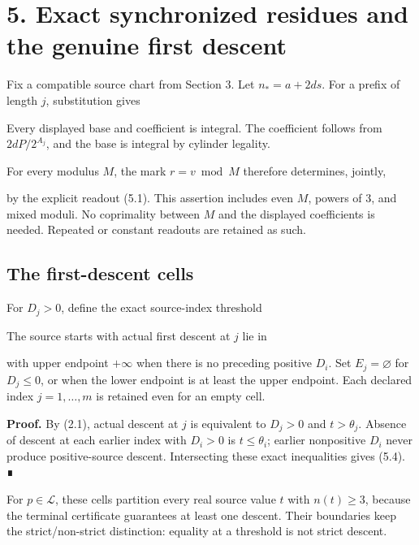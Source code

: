 \section{5. Exact synchronized residues and the genuine first descent}

Fix a compatible source chart from Section 3. Let \(n_*=a+2ds\). For a
prefix of length \(j\), substitution gives


Every displayed base and coefficient is integral. The coefficient
follows from \(2dP/2^{A_j}\), and the base is integral by cylinder
legality.

For every modulus \(M\), the mark \(r=v\bmod M\) therefore determines,
jointly,


by the explicit readout (5.1). This assertion includes even \(M\),
powers of 3, and mixed moduli. No coprimality between \(M\) and the
displayed coefficients is needed. Repeated or constant readouts are
retained as such.

\subsection{The first-descent cells}

For \(D_j>0\), define the exact source-index threshold


The source starts with actual first descent at \(j\) lie in

\SourceMath{E_j(p)=\left(\theta_j,\ \min_{i<j,\,D_i>0}\theta_i\right],}{5.4}

with upper endpoint \(+\infty\) when there is no preceding positive
\(D_i\). Set \(E_j=\varnothing\) for \(D_j\le0\), or when the lower
endpoint is at least the upper endpoint. Each declared index
\(j=1,\ldots,m\) is retained even for an empty cell.

\textbf{Proof.} By (2.1), actual descent at \(j\) is equivalent to
\(D_j>0\) and \(t>\theta_j\). Absence of descent at each earlier index
with \(D_i>0\) is \(t\le\theta_i\); earlier nonpositive \(D_i\) never
produce positive-source descent. Intersecting these exact inequalities
gives (5.4). ∎

For \(p\in\mathcal L\), these cells partition every real source value
\(t\) with \(n(t)\ge3\), because the terminal certificate guarantees at
least one descent. Their boundaries keep the strict/non-strict
distinction: equality at a threshold is not strict descent.

